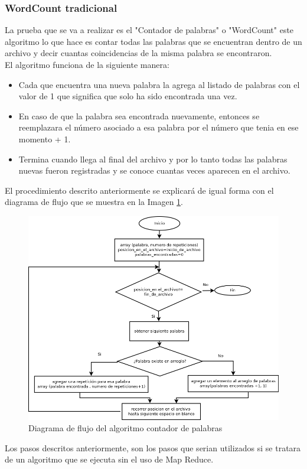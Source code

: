 \subsubsection{WordCount tradicional}
La prueba que se va a realizar es el "Contador de palabras" o "WordCount" este algoritmo lo que hace es contar todas las palabras que se encuentran dentro de un archivo y decir cuantas coincidencias de la misma palabra se encontraron. 
\\ 
El algoritmo funciona de la siguiente manera:
\begin{itemize}
\item Cada que encuentra una nueva palabra la agrega al listado de palabras con el valor de 1 que significa que solo ha sido encontrada una vez.
\item En caso de que la palabra sea encontrada nuevamente, entonces se reemplazara el número asociado a esa palabra por el número que tenia en ese momento + 1.
\item Termina cuando llega al final del archivo y por lo tanto todas las palabras nuevas fueron registradas y se conoce cuantas veces aparecen en el archivo.
\end{itemize} 
El procedimiento descrito anteriormente se explicará de igual forma con el diagrama de flujo que se muestra en la Imagen \ref{fig:redi}.

\begin{figure}[!htbp]
	\hypertarget{fig:redi}{\hspace{1pt}}
	\begin{center}
		\includegraphics[width=.7\textwidth]{capitulo4/images/im1.png}
		\caption{Diagrama de flujo del algoritmo contador de palabras}
		\label{fig:redi}
	\end{center}
\end{figure}
Los pasos descritos anteriormente, son los pasos que serian utilizados si se tratara de un algoritmo que se ejecuta sin el uso de Map Reduce.
